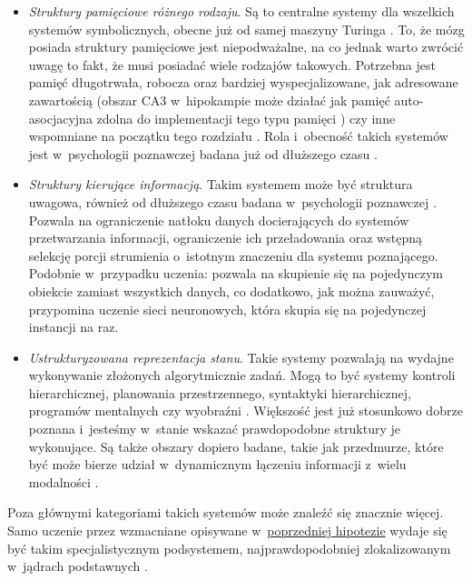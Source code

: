 \begin{itemize}
	\item \emph{Struktury pamięciowe różnego rodzaju}.
	      Są to centralne systemy dla wszelkich systemów symbolicznych, obecne już od samej maszyny Turinga \cite{turing1937computable}.
	      To, że mózg posiada struktury pamięciowe jest niepodważalne, na co jednak warto zwrócić uwagę to fakt, że musi posiadać wiele rodzajów takowych.
	      Potrzebna jest pamięć długotrwała, robocza oraz bardziej wyspecjalizowane, jak adresowane zawartością (obszar CA3 w~hipokampie może działać jak pamięć auto-asocjacyjna zdolna do implementacji tego typu pamięci \cite{rolls2013mechanisms}) czy inne wspomniane na początku tego rozdziału \cite{graves2014neural}.
	      Rola i~obecność takich systemów jest w~psychologii poznawczej badana już od dłuższego czasu \cite{baddeley2004psychology}.
	\item \emph{Struktury kierujące informacją}.
	      Takim systemem może być struktura uwagowa, również od dłuższego czasu badana w~psychologii poznawczej \cite{pashler1999psychology}.
	      Pozwala na ograniczenie natłoku danych docierających do systemów przetwarzania informacji, ograniczenie ich przeładowania oraz wstępną selekcję porcji strumienia o~istotnym znaczeniu dla systemu poznającego.
	      Podobnie w~przypadku uczenia: pozwala na skupienie się na pojedynczym obiekcie zamiast wszystkich danych, co dodatkowo, jak można zauważyć, przypomina uczenie sieci neuronowych, która skupia się na pojedynczej instancji na raz.
	\item \emph{Ustrukturyzowana reprezentacja stanu}.
	      Takie systemy pozwalają na wydajne wykonywanie złożonych algorytmicznie zadań.
	      Mogą to być systemy kontroli hierarchicznej, planowania przestrzennego, syntaktyki hierarchicznej, programów mentalnych czy wyobraźni \cite{marblestone2016toward}.
	      Większość jest już stosunkowo dobrze poznana i~jesteśmy w~stanie wskazać prawdopodobne struktury je wykonujące.
	      Są także obszary dopiero badane, takie jak przedmurze, które być może bierze udział w~dynamicznym łączeniu informacji z~wielu modalności \cite{crick2005function}.
\end{itemize}

Poza głównymi kategoriami takich systemów może znaleźć się znacznie więcej.
Samo uczenie przez wzmacniane opisywane w~\hyperref[subsec:cost-function-is-diverse]{poprzedniej hipotezie} wydaje się być takim specjalistycznym podsystemem, najprawdopodobniej zlokalizowanym w~jądrach podstawnych \cite{doya1999computations}.

